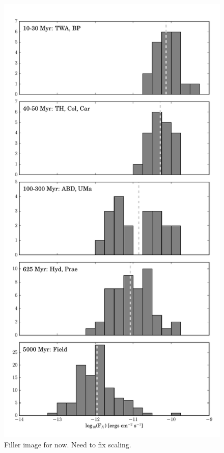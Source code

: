 \documentclass[twocolumn]{aastex62}
\begin{document}
\begin{figure}[t]
\centering
\includegraphics[height=0.6\textheight]{histfd_xray.pdf}
\caption{Filler image for now. Need to fix scaling. \label{fig:histfd_xray}}
\end{figure}
\end{document}
